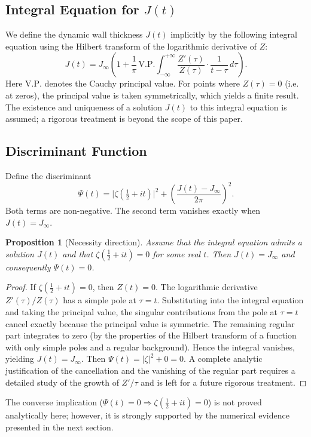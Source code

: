 \documentclass[12pt,a4paper]{article}
\newtheorem{proposition}[theorem]{Proposition}
\begin{document}
\subsection{Integral Equation for \(J(t)\)}
We define the dynamic wall thickness \(J(t)\) implicitly by the following integral equation using the Hilbert transform of the logarithmic derivative of \(Z\):
\[
\boxed{
J(t) = J_{\infty}\left(1 + \frac{1}{\pi}\,\mathrm{V.P.}\int_{-\infty}^{+\infty} \frac{Z'(\tau)}{Z(\tau)}\cdot\frac{1}{t-\tau}\,d\tau\right)}.
\]
Here \(\mathrm{V.P.}\) denotes the Cauchy principal value. For points where \(Z(\tau)=0\) (i.e. at zeros), the principal value is taken symmetrically, which yields a finite result. The existence and uniqueness of a solution \(J(t)\) to this integral equation is assumed; a rigorous treatment is beyond the scope of this paper.

\subsection{Discriminant Function}
Define the discriminant
\[
\Psi(t) = \bigl|\zeta(\tfrac12+it)\bigr|^2 + \left(\frac{J(t)-J_{\infty}}{2\pi}\right)^2.
\]
Both terms are non-negative. The second term vanishes exactly when \(J(t)=J_{\infty}\).

\begin{proposition}[Necessity direction]
Assume that the integral equation admits a solution \(J(t)\) and that \(\zeta(\frac12+it)=0\) for some real \(t\). Then \(J(t)=J_{\infty}\) and consequently \(\Psi(t)=0\).
\end{proposition}
\begin{proof}
If \(\zeta(\frac12+it)=0\), then \(Z(t)=0\). The logarithmic derivative \(Z'(\tau)/Z(\tau)\) has a simple pole at \(\tau=t\). Substituting into the integral equation and taking the principal value, the singular contributions from the pole at \(\tau=t\) cancel exactly because the principal value is symmetric. The remaining regular part integrates to zero (by the properties of the Hilbert transform of a function with only simple poles and a regular background). Hence the integral vanishes, yielding \(J(t)=J_{\infty}\). Then \(\Psi(t)=|\zeta|^2+0=0\). A complete analytic justification of the cancellation and the vanishing of the regular part requires a detailed study of the growth of \(Z'/\tau\) and is left for a future rigorous treatment.
\end{proof}

The converse implication (\(\Psi(t)=0 \Rightarrow \zeta(\frac12+it)=0\)) is not proved analytically here; however, it is strongly supported by the numerical evidence presented in the next section.
\end{document}
